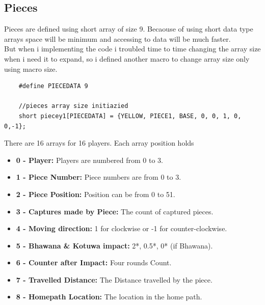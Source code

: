 \documentclass{article}
\begin{document}
\subsection{Pieces}
Pieces are defined using short array of size 9. Becaouse of using short data type arrays space will be minimum and accessing to data will be much faster.\\
But when i implementing the code i troubled time to time changing the array size when i need it to expand, so i defined another macro to change array size only using macro size.
\begin{verbatim}
    #define PIECEDATA 9

    //pieces array size initiazied
    short piecey1[PIECEDATA] = {YELLOW, PIECE1, BASE, 0, 0, 1, 0, 0,-1};
\end{verbatim}
There are 16 arrays for 16 players. Each array position holds\\
\begin{itemize}
    \item \textbf{0 - Player:} Players are numbered from 0 to 3.
    \item \textbf{1 - Piece Number:} Piece numbers are from 0 to 3.
    \item \textbf{2 - Piece Position:} Position can be from 0 to 51.
    \item \textbf{3 - Captures made by Piece:} The count of captured pieces.
    \item \textbf{4 - Moving direction:} 1 for clockwise or -1 for counter-clockwise.
    \item \textbf{5 - Bhawana \& Kotuwa impact:} 2*, 0.5*, 0* (if Bhawana).
    \item \textbf{6 - Counter after Impact:} Four rounds Count.
    \item \textbf{7 - Travelled Distance:} The Distance travelled by the piece.
    \item \textbf{8 - Homepath Location:} The location in the home path.
\end{itemize}


\end{document}
